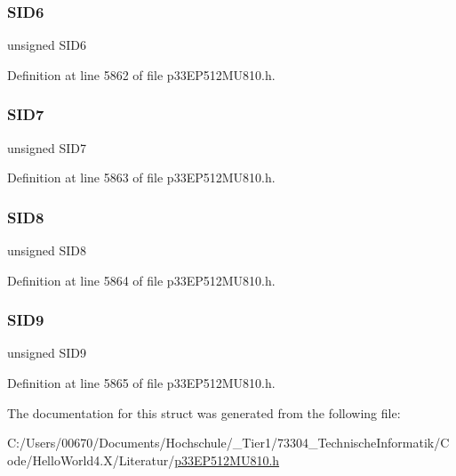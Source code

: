 \subsubsection{\texorpdfstring{S\+I\+D6}{SID6}}
{\footnotesize\ttfamily unsigned S\+I\+D6}



Definition at line 5862 of file p33\+E\+P512\+M\+U810.\+h.

\mbox{\label{structtag_c2_r_x_m0_s_i_d_b_i_t_s_a34097fb76decd431701fa2d86a22328e}} 
\subsubsection{\texorpdfstring{S\+I\+D7}{SID7}}
{\footnotesize\ttfamily unsigned S\+I\+D7}



Definition at line 5863 of file p33\+E\+P512\+M\+U810.\+h.

\mbox{\label{structtag_c2_r_x_m0_s_i_d_b_i_t_s_afe74894633244fdb0b0c01b4e8c522e7}} 
\subsubsection{\texorpdfstring{S\+I\+D8}{SID8}}
{\footnotesize\ttfamily unsigned S\+I\+D8}



Definition at line 5864 of file p33\+E\+P512\+M\+U810.\+h.

\mbox{\label{structtag_c2_r_x_m0_s_i_d_b_i_t_s_a33587704948067005c2a6a3ccc503c99}} 
\subsubsection{\texorpdfstring{S\+I\+D9}{SID9}}
{\footnotesize\ttfamily unsigned S\+I\+D9}



Definition at line 5865 of file p33\+E\+P512\+M\+U810.\+h.



The documentation for this struct was generated from the following file\+:\begin{DoxyCompactItemize}
\item 
C\+:/\+Users/00670/\+Documents/\+Hochschule/\+\_\+\+Tier1/73304\+\_\+\+Technische\+Informatik/\+Code/\+Hello\+World4.\+X/\+Literatur/\hyperlink{p33_e_p512_m_u810_8h}{p33\+E\+P512\+M\+U810.\+h}\end{DoxyCompactItemize}
